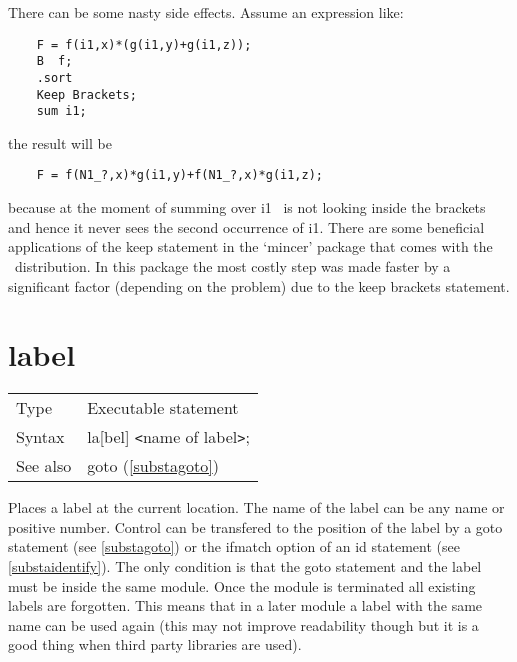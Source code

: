 \noindent There can be some nasty side effects. Assume an expression like:
\begin{verbatim}
    F = f(i1,x)*(g(i1,y)+g(i1,z));
    B  f;
    .sort
    Keep Brackets;
    sum i1;
\end{verbatim}
the result will be
\begin{verbatim}
    F = f(N1_?,x)*g(i1,y)+f(N1_?,x)*g(i1,z);
\end{verbatim}
because at the moment of summing over i1 \FORM\ is not looking inside the 
brackets and hence it never sees the second occurrence of i1. There are 
some beneficial applications of the keep statement in the 
`mincer' package that comes with the \FORM\ distribution. In 
this package the most costly step was made faster by a significant factor 
(depending on the problem) due to the keep brackets statement. 
\vspace{10mm}


\section{label}
\label{substalabel}

\noindent \begin{tabular}{ll}
Type & Executable statement\\
Syntax & la[bel] {\tt<}name of label{\tt>};
\\ See also & goto (\ref{substagoto})
\end{tabular} \vspace{4mm}

\noindent Places a label at the current location. The name of 
the label can be any name or positive number. Control can be transfered to the 
position of the label by a goto statement (see 
\ref{substagoto}) or the ifmatch option of an id statement 
(see \ref{substaidentify}). The only condition is that the goto statement 
and the label must be inside the same module. Once the module is terminated 
all existing labels are forgotten. This means that in a later module a 
label with the same name can be used again (this may not improve 
readability though but it is a good thing when third party libraries are 
used). \vspace{10mm}


